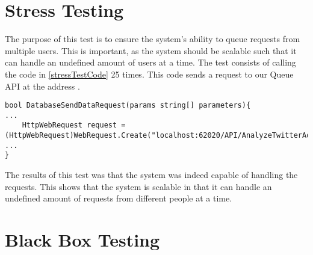 \section{Stress Testing}
The purpose of this test is to ensure the system's ability to queue requests
from multiple users. This is important, as the system should be scalable such
that it can handle an undefined amount of users at a time. The test consists of
calling the code in \autoref{stressTestCode} 25 times. This code sends a request
to our Queue API at the address .\nl

\begin{minipage}[H]{\linewidth}
\begin{lstlisting}[caption = Code initiating the stress test, label = stressTestCode] 
bool DatabaseSendDataRequest(params string[] parameters){
...
	HttpWebRequest request = (HttpWebRequest)WebRequest.Create("localhost:62020/API/AnalyzeTwitterAccount");
...
}
\end{lstlisting}
\end{minipage}

The results of this test was that the system was indeed capable of handling the
requests. This shows that the system is scalable in that it can handle an
undefined amount of requests from different people at a time.

\section{Black Box Testing}



